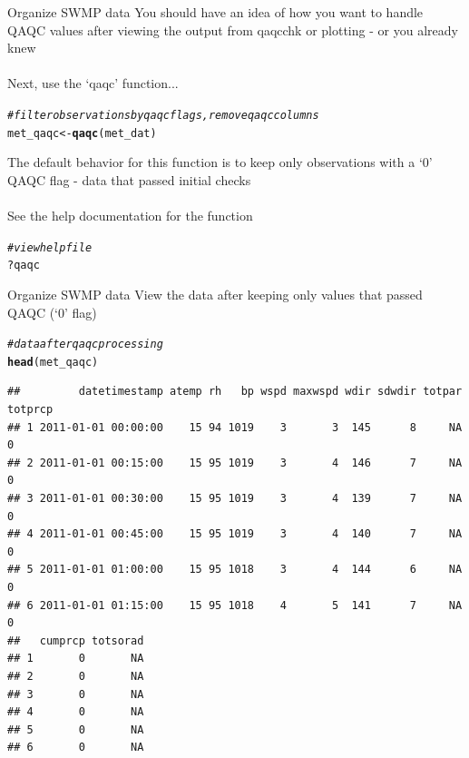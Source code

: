 \documentclass[xcolor=svgnames]{beamer}\usepackage[]{graphicx}\usepackage[]{color}
\makeatletter
\newcommand{\hlcom}[1]{\textcolor[rgb]{0.678,0.584,0.686}{\textit{#1}}}%
\newcommand{\hlopt}[1]{\textcolor[rgb]{0,0,0}{#1}}%
\newcommand{\hlstd}[1]{\textcolor[rgb]{0.345,0.345,0.345}{#1}}%
\newcommand{\hlkwb}[1]{\textcolor[rgb]{0.69,0.353,0.396}{#1}}%
\newcommand{\hlkwd}[1]{\textcolor[rgb]{0.737,0.353,0.396}{\textbf{#1}}}%
\newenvironment{kframe}{%
 \def\at@end@of@kframe{}%
 \ifinner\ifhmode%
  \def\at@end@of@kframe{\end{minipage}}%
  \begin{minipage}{\columnwidth}%
 \fi\fi%
 \def\FrameCommand##1{\hskip\@totalleftmargin \hskip-\fboxsep
 \colorbox{shadecolor}{##1}\hskip-\fboxsep
     \hskip-\linewidth \hskip-\@totalleftmargin \hskip\columnwidth}%
 \MakeFramed {\advance\hsize-\width
   \@totalleftmargin\z@ \linewidth\hsize
   \@setminipage}}%
 {\par\unskip\endMakeFramed%
 \at@end@of@kframe}
\newenvironment{knitrout}{}{} %
\makeatother
\begin{document}
\begin{frame}[containsverbatim]{Organize SWMP data}
You should have an idea of how you want to handle QAQC values after viewing the output from qaqcchk or plotting - or you already knew \\~\\
Next, use the `qaqc' function...
\begin{knitrout}\scriptsize
{}\color{fgcolor}\begin{kframe}
\begin{alltt}
\hlcom{# filter observations by qaqc flags, remove qaqc columns}
\hlstd{met_qaqc} \hlkwb{<-} \hlkwd{qaqc}\hlstd{(met_dat)}
\end{alltt}
\end{kframe}
\end{knitrout}
The default behavior for this function is to keep only observations with a `0' QAQC flag - data that passed initial checks\\~\\
See the help documentation for the function
\begin{knitrout}\scriptsize
{}\color{fgcolor}\begin{kframe}
\begin{alltt}
\hlcom{# view help file}
\hlopt{?}\hlstd{qaqc}
\end{alltt}
\end{kframe}
\end{knitrout}
\end{frame}

\begin{frame}[containsverbatim]{Organize SWMP data}
View the data after keeping only values that passed QAQC (`0' flag)
\begin{knitrout}\scriptsize
{}\color{fgcolor}\begin{kframe}
\begin{alltt}
\hlcom{# data after qaqc processing}
\hlkwd{head}\hlstd{(met_qaqc)}
\end{alltt}
\begin{verbatim}
##         datetimestamp atemp rh   bp wspd maxwspd wdir sdwdir totpar totprcp
## 1 2011-01-01 00:00:00    15 94 1019    3       3  145      8     NA       0
## 2 2011-01-01 00:15:00    15 95 1019    3       4  146      7     NA       0
## 3 2011-01-01 00:30:00    15 95 1019    3       4  139      7     NA       0
## 4 2011-01-01 00:45:00    15 95 1019    3       4  140      7     NA       0
## 5 2011-01-01 01:00:00    15 95 1018    3       4  144      6     NA       0
## 6 2011-01-01 01:15:00    15 95 1018    4       5  141      7     NA       0
##   cumprcp totsorad
## 1       0       NA
## 2       0       NA
## 3       0       NA
## 4       0       NA
## 5       0       NA
## 6       0       NA
\end{verbatim}
\end{kframe}
\end{knitrout}
\end{frame}
\end{document}
